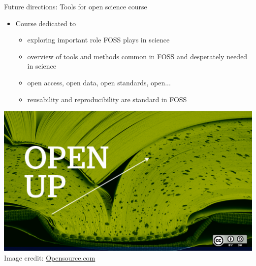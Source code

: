\documentclass[xcolor={dvipsnames,usenames},beamer]{beamer}
\begin{document}
\begin{frame}{Future directions: Tools for open science course}

\begin{overlayarea}{\textwidth}{\textheight}

\begin{itemize}
 \item Course dedicated to
 \begin{itemize}
  \item exploring important role FOSS plays in science
  \item overview of tools and methods common in FOSS and desperately needed in science
  \item open access, open data, open standards, open...
  \item reusability and reproducibility are standard in FOSS
 \end{itemize}
\end{itemize}

\smallskip

\centering
\includegraphics[height=0.5\textheight]{./images/general/open_up_book}%
\\
\tiny
Image credit: \href{https://opensource.com/}{Opensource.com}


\end{overlayarea}

\end{frame}
\end{document}
